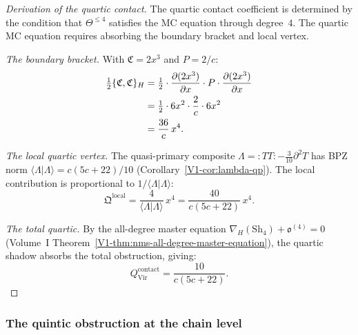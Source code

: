 \begin{proof}[Derivation of the quartic contact]
The quartic contact coefficient is determined by the
condition that $\Theta^{\leq 4}$ satisfies the MC equation
through degree~$4$. The quartic MC equation requires
absorbing the boundary bracket and local vertex.

\emph{The boundary bracket.}
With $\mathfrak{C} = 2x^3$ and $P = 2/c$:
\begin{align}
\tfrac{1}{2}\{\mathfrak{C}, \mathfrak{C}\}_H
&= \tfrac{1}{2} \cdot
 \frac{\partial(2x^3)}{\partial x} \cdot P \cdot
 \frac{\partial(2x^3)}{\partial x} \notag \\
&= \tfrac{1}{2} \cdot 6x^2 \cdot \frac{2}{c}
 \cdot 6x^2 \notag \\
&= \frac{36}{c}\,x^4. %
\end{align}

\emph{The local quartic vertex.}
The quasi-primary composite
$\Lambda = {:}TT{:} - \frac{3}{10}\partial^2 T$
has BPZ norm
$\langle \Lambda | \Lambda \rangle = c(5c+22)/10$
(Corollary~\ref{V1-cor:lambda-qp}).
The local contribution is proportional to $1/\langle\Lambda|\Lambda\rangle$:
\begin{equation}%
\mathfrak{Q}^{\mathrm{local}}
= \frac{4}{\langle\Lambda|\Lambda\rangle}\,x^4
= \frac{40}{c(5c+22)}\,x^4.
\end{equation}

\emph{The total quartic.}
By the all-degree master equation
$\nabla_H(\mathrm{Sh}_4) + \mathfrak{o}^{(4)} = 0$
(Volume~I Theorem~\ref{V1-thm:nms-all-degree-master-equation}),
the quartic shadow absorbs the total obstruction, giving:
\begin{equation}%
Q^{\mathrm{contact}}_{\mathrm{Vir}}
= \frac{10}{c(5c+22)}.
\end{equation}
\end{proof}

\subsubsection{The quintic obstruction at the chain level}

